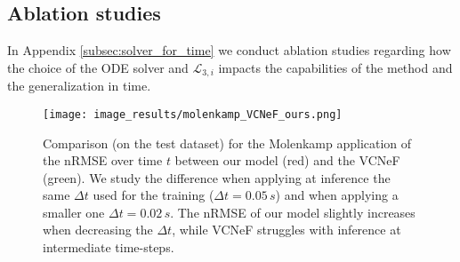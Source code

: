 \subsection{Ablation studies}
In Appendix \ref{subsec:solver_for_time} we conduct ablation studies regarding how the choice of the ODE solver and $\mathcal{L}_{3,i}$ impacts the capabilities of the method and the generalization in time.


\begin{figure*}
  \centering
  \texttt{[image: image\_results/molenkamp\_VCNeF\_ours.png]}
  \caption{Comparison (on the test dataset) for the Molenkamp application of the nRMSE over time $t$ between our model (red) and the VCNeF (green). We study the difference when applying at inference the same $\Delta t $ used for the training ($\Delta t = 0.05\,s$) and when applying a smaller one $\Delta t = 0.02\,s$. The nRMSE of our model slightly increases when decreasing the $\Delta t $, while VCNeF struggles with inference at intermediate time-steps.}
  \label{fig:molenkamp}
\end{figure*}